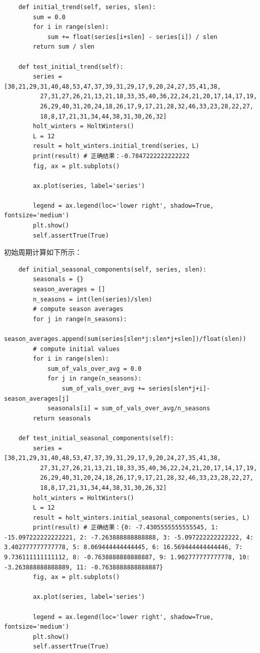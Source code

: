 \documentclass{article}
\begin{document}
\begin{lstlisting}
    def initial_trend(self, series, slen):
        sum = 0.0
        for i in range(slen):
            sum += float(series[i+slen] - series[i]) / slen
        return sum / slen
        
    def test_initial_trend(self):
        series = [30,21,29,31,40,48,53,47,37,39,31,29,17,9,20,24,27,35,41,38,
          27,31,27,26,21,13,21,18,33,35,40,36,22,24,21,20,17,14,17,19,
          26,29,40,31,20,24,18,26,17,9,17,21,28,32,46,33,23,28,22,27,
          18,8,17,21,31,34,44,38,31,30,26,32]
        holt_winters = HoltWinters()
        L = 12
        result = holt_winters.initial_trend(series, L)
        print(result) # 正确结果：-0.7847222222222222
        fig, ax = plt.subplots()
        
        ax.plot(series, label='series')
        
        legend = ax.legend(loc='lower right', shadow=True, fontsize='medium')
        plt.show()
        self.assertTrue(True)        
\end{lstlisting}
初始周期计算如下所示：
\begin{lstlisting}
    def initial_seasonal_components(self, series, slen):
        seasonals = {}
        season_averages = []
        n_seasons = int(len(series)/slen)
        # compute season averages
        for j in range(n_seasons):
            season_averages.append(sum(series[slen*j:slen*j+slen])/float(slen))
        # compute initial values
        for i in range(slen):
            sum_of_vals_over_avg = 0.0
            for j in range(n_seasons):
                sum_of_vals_over_avg += series[slen*j+i]-season_averages[j]
            seasonals[i] = sum_of_vals_over_avg/n_seasons
        return seasonals
        
    def test_initial_seasonal_components(self):
        series = [30,21,29,31,40,48,53,47,37,39,31,29,17,9,20,24,27,35,41,38,
          27,31,27,26,21,13,21,18,33,35,40,36,22,24,21,20,17,14,17,19,
          26,29,40,31,20,24,18,26,17,9,17,21,28,32,46,33,23,28,22,27,
          18,8,17,21,31,34,44,38,31,30,26,32]
        holt_winters = HoltWinters()
        L = 12
        result = holt_winters.initial_seasonal_components(series, L)
        print(result) # 正确结果：{0: -7.4305555555555545, 1: -15.097222222222221, 2: -7.263888888888888, 3: -5.097222222222222, 4: 3.402777777777778, 5: 8.069444444444445, 6: 16.569444444444446, 7: 9.736111111111112, 8: -0.7638888888888887, 9: 1.902777777777778, 10: -3.263888888888889, 11: -0.7638888888888887}
        fig, ax = plt.subplots()
        
        ax.plot(series, label='series')
        
        legend = ax.legend(loc='lower right', shadow=True, fontsize='medium')
        plt.show()
        self.assertTrue(True)        
\end{lstlisting}
\end{document}
